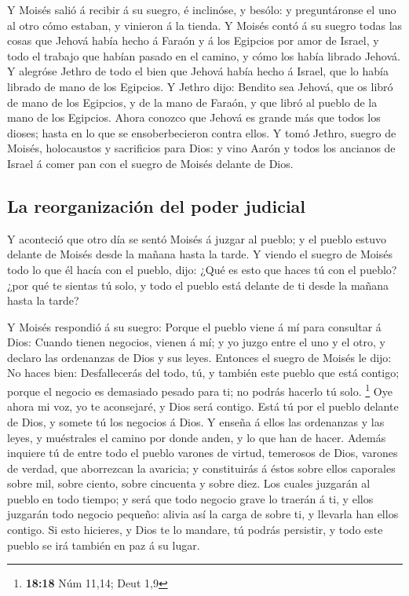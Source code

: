  Y Moisés salió á recibir á su suegro, é inclinóse, y
besólo: y preguntáronse el uno al otro cómo estaban, y vinieron á la
tienda.  Y Moisés contó á su suegro todas las cosas que
Jehová había hecho á Faraón y á los Egipcios por amor de Israel, y todo
el trabajo que habían pasado en el camino, y cómo los había librado
Jehová.  Y alegróse Jethro de todo el bien que Jehová había
hecho á Israel, que lo había librado de mano de los Egipcios.
 Y Jethro dijo: Bendito sea Jehová, que os libró de mano de
los Egipcios, y de la mano de Faraón, y que libró al pueblo de la mano
de los Egipcios.  Ahora conozco que Jehová es grande más
que todos los dioses; hasta en lo que se ensoberbecieron contra ellos.
 Y tomó Jethro, suegro de Moisés, holocaustos y sacrificios
para Dios: y vino Aarón y todos los ancianos de Israel á comer pan con
el suegro de Moisés delante de Dios.

\hypertarget{la-reorganizaciuxf3n-del-poder-judicial}{%
\subsection{La reorganización del poder
judicial}\label{la-reorganizaciuxf3n-del-poder-judicial}}

 Y aconteció que otro día se sentó Moisés á juzgar al
pueblo; y el pueblo estuvo delante de Moisés desde la mañana hasta la
tarde.  Y viendo el suegro de Moisés todo lo que él hacía
con el pueblo, dijo: ¿Qué es esto que haces tú con el pueblo? ¿por qué
te sientas tú solo, y todo el pueblo está delante de ti desde la mañana
hasta la tarde?

 Y Moisés respondió á su suegro: Porque el pueblo viene á
mí para consultar á Dios:  Cuando tienen negocios, vienen á
mí; y yo juzgo entre el uno y el otro, y declaro las ordenanzas de Dios
y sus leyes.  Entonces el suegro de Moisés le dijo: No
haces bien:  Desfallecerás del todo, tú, y también este
pueblo que está contigo; porque el negocio es demasiado pesado para ti;
no podrás hacerlo tú solo. \footnote{\textbf{18:18} Núm 11,14; Deut 1,9}
 Oye ahora mi voz, yo te aconsejaré, y Dios será contigo.
Está tú por el pueblo delante de Dios, y somete tú los negocios á Dios.
 Y enseña á ellos las ordenanzas y las leyes, y muéstrales
el camino por donde anden, y lo que han de hacer.  Además
inquiere tú de entre todo el pueblo varones de virtud, temerosos de
Dios, varones de verdad, que aborrezcan la avaricia; y constituirás á
éstos sobre ellos caporales sobre mil, sobre ciento, sobre cincuenta y
sobre diez.  Los cuales juzgarán al pueblo en todo tiempo;
y será que todo negocio grave lo traerán á ti, y ellos juzgarán todo
negocio pequeño: alivia así la carga de sobre ti, y llevarla han ellos
contigo.  Si esto hicieres, y Dios te lo mandare, tú podrás
persistir, y todo este pueblo se irá también en paz á su lugar.

